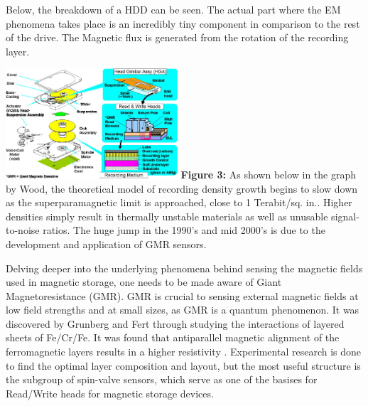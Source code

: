 \documentclass[11pt]{article}
\begin{document}
\begin{multicols}{2}
Below, the breakdown of a HDD can be seen. The actual part where the EM phenomena takes place is an incredibly tiny component in comparison to the rest of the drive\cite{label6}. The Magnetic flux is generated from the rotation of the recording layer. 
\begin{center}
	\centering
	\includegraphics[width=0.48\textwidth]{HDD_Makeup.png}
	{\footnotesize\textbf{Figure 3:} As shown below in the graph by Wood, the theoretical model of recording density growth begins to slow down as the superparamagnetic limit is approached, close to 1 Terabit/sq. in.. Higher densities simply result in thermally unstable materials as well as unusable signal-to-noise ratios. The huge jump in the 1990’s and mid 2000’s is due to the development and application of GMR sensors. \cite{label6}} 
\end{center} 


Delving deeper into the underlying phenomena behind sensing the magnetic fields used in magnetic storage, one needs to be made aware of Giant Magnetoresistance (GMR). GMR is crucial to sensing external magnetic fields at low field strengths and at small sizes, as GMR is a quantum phenomenon. It was discovered by Grunberg and Fert through studying the interactions of layered sheets of Fe/Cr/Fe. It was found that antiparallel magnetic alignment of the ferromagnetic layers results in a higher resistivity \cite{label5}. Experimental research is done to find the optimal layer composition and layout, but the most useful structure is the subgroup of spin-valve sensors, which serve as one of the basises for Read/Write heads for magnetic storage devices.


\end{multicols}
\end{document}

